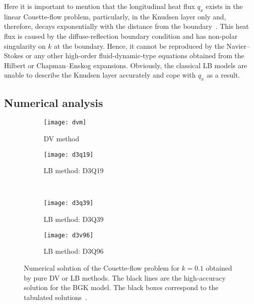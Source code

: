 \documentclass{elsarticle} %
\begin{document}
Here it is important to mention that the longitudinal heat flux $q_x$ exists in the linear Couette-flow problem,
particularly, in the Knudsen layer only and, therefore, decays exponentially with the distance from the boundary~\cite{Sone2007}.
This heat flux is caused by the diffuse-reflection boundary condition and has non-polar singularity on $k$ at the boundary.
Hence, it cannot be reproduced by the Navier--Stokes or any other high-order fluid-dynamic-type equations
obtained from the Hilbert or Chapman--Enskog expansions.
Obviously, the classical LB models are unable to describe the Knudsen layer accurately and cope with \(q_x\) as a result.

\subsection{Numerical analysis}

\begin{figure}
    \centering
    \begin{subfigure}[b]{0.5\textwidth}
        \texttt{[image: dvm]}
        \caption{DV method}
        \label{fig:dvm}
    \end{subfigure}%
    \begin{subfigure}[b]{0.5\textwidth}
        \texttt{[image: d3q19]}
        \caption{LB method: D3Q19}
        \label{fig:d3q19}
    \end{subfigure}\\
    \begin{subfigure}[b]{0.5\textwidth}
        \texttt{[image: d3q39]}
        \caption{LB method: D3Q39}
        \label{fig:d3q39}
    \end{subfigure}%
    \begin{subfigure}[b]{0.5\textwidth}
        \texttt{[image: d3v96]}
        \caption{LB method: D3Q96}
        \label{fig:d3q96}
    \end{subfigure}
    \caption{
        Numerical solution of the Couette-flow problem for \(k=0.1\) obtained by pure DV or LB methods.
        The black lines are the high-accuracy solution for the BGK model.
        The black boxes correspond to the tabulated solutions~\cite{Luo2016}.
    }\label{fig:pure}
\end{figure}
\end{document}
